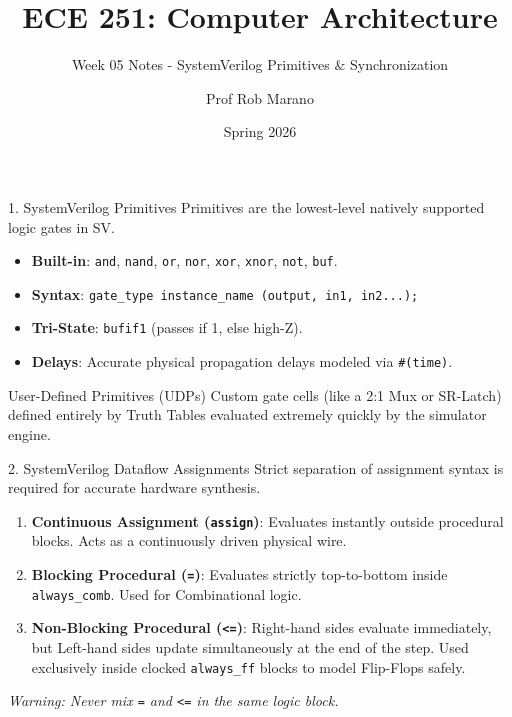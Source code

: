 \documentclass[aspectratio=169]{beamer}
\title{ECE 251: Computer Architecture}
\subtitle{Week 05 Notes - SystemVerilog Primitives \& Synchronization}
\author{Prof Rob Marano}
\date{Spring 2026}
\begin{document}
\frame{\titlepage}

\begin{frame}{1. SystemVerilog Primitives}
Primitives are the lowest-level natively supported logic gates in SV.
\vspace{0.2cm}
\begin{itemize}
    \item \textbf{Built-in}: \texttt{and}, \texttt{nand}, \texttt{or}, \texttt{nor}, \texttt{xor}, \texttt{xnor}, \texttt{not}, \texttt{buf}.
    \item \textbf{Syntax}: \texttt{gate\_type instance\_name (output, in1, in2...);}
    \item \textbf{Tri-State}: \texttt{bufif1} (passes if 1, else high-Z).
    \item \textbf{Delays}: Accurate physical propagation delays modeled via \texttt{\#(time)}.
\end{itemize}
\begin{block}{User-Defined Primitives (UDPs)}
Custom gate cells (like a 2:1 Mux or SR-Latch) defined entirely by Truth Tables evaluated extremely quickly by the simulator engine. 
\end{block}
\end{frame}

\begin{frame}{2. SystemVerilog Dataflow Assignments}
Strict separation of assignment syntax is required for accurate hardware synthesis.
\vspace{0.2cm}
\begin{enumerate}
    \item \textbf{Continuous Assignment (\texttt{assign})}: Evaluates instantly outside procedural blocks. Acts as a continuously driven physical wire.
    \item \textbf{Blocking Procedural (\texttt{=})}: Evaluates strictly top-to-bottom inside \texttt{always\_comb}. Used for Combinational logic.
    \item \textbf{Non-Blocking Procedural (\texttt{<=})}: Right-hand sides evaluate immediately, but Left-hand sides update simultaneously at the end of the step. Used exclusively inside clocked \texttt{always\_ff} blocks to model Flip-Flops safely.
\end{enumerate}
\vspace{0.2cm}
\textit{Warning: Never mix \texttt{=} and \texttt{<=} in the same logic block.}
\end{frame}
\end{document}
